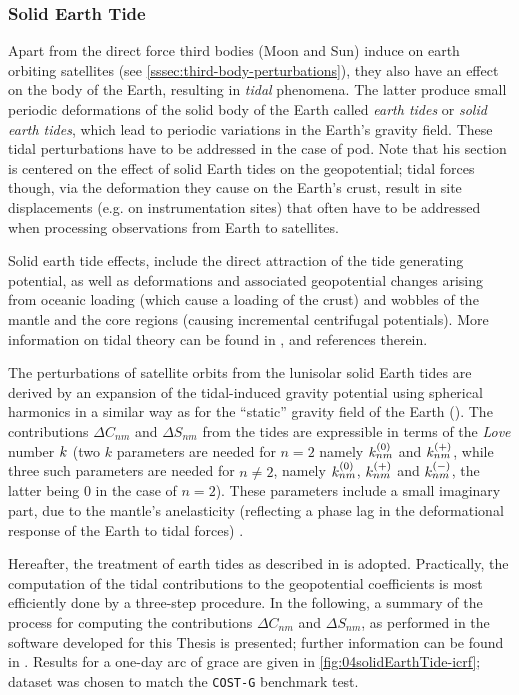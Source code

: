 \subsubsection{Solid Earth Tide}\label{sssec:earth-tide-perturbations}

Apart from the direct force third bodies (Moon and Sun) induce on earth orbiting 
satellites (see \autoref{sssec:third-body-perturbations}), they also have an effect on 
the body of the Earth, resulting in \emph{tidal} phenomena. The latter produce 
small periodic deformations of the solid body of the Earth called \emph{earth tides} 
or \emph{solid earth tides}, which lead to periodic variations in the Earth's gravity 
field. These tidal perturbations have to be addressed in the case of \gls{pod}. 
Note that his section is centered on the effect of solid Earth tides on the geopotential; 
tidal forces though, via the deformation they cause on the Earth's crust, result in 
site displacements (e.g. on instrumentation sites) that often have to be addressed when 
processing observations from Earth to satellites.

Solid earth tide effects, include the direct attraction of the tide generating 
potential, as well as deformations and associated geopotential changes arising 
from oceanic loading (which cause a loading of the crust) and wobbles of the 
mantle and the core regions (causing incremental centrifugal potentials). More 
information on tidal theory can be found in \cite{Wilhelm1997}, \cite{iers2010} 
and references therein. 

The perturbations of satellite orbits from the lunisolar solid Earth tides are
derived by an expansion of the tidal-induced gravity potential using spherical 
harmonics in a similar way as for the ``static'' gravity field of the Earth 
(\cite{Montenbruck2000}). The contributions $\Delta C_{nm}$ and $\Delta S_{nm}$ 
from the tides are expressible in terms of the \emph{Love} number $k$ (two 
$k$ parameters are needed for $n=2$ namely $k ^{(0)}_{nm}$ and $k ^{(+)}_{nm}$, 
while three such parameters are needed for $n \ne 2$, namely $k ^{(0)}_{nm}$, 
$k ^{(+)}_{nm}$ and $k ^{(-)}_{nm}$, the latter being $0$ in the case 
of $n=2$). These parameters include a small imaginary part, due to the mantle's 
anelasticity (reflecting a phase lag in the deformational response of the Earth 
to tidal forces) \cite{iers2010}.

Hereafter, the treatment of earth tides as described in \cite{iers2010} is
adopted. Practically, the computation of the tidal contributions to the 
geopotential coefficients is most efficiently done by a three-step procedure. 
In the following, a summary of the process for computing the contributions 
$\Delta C_{nm}$ and $\Delta S_{nm}$, as performed in the software developed for 
this Thesis is presented; further information can be found in \cite{iers2010}. 
Results for a one-day arc of \gls{grace} are given in \autoref{fig:04solidEarthTide-icrf}; 
dataset was chosen to match the \texttt{COST-G} benchmark test.
 
